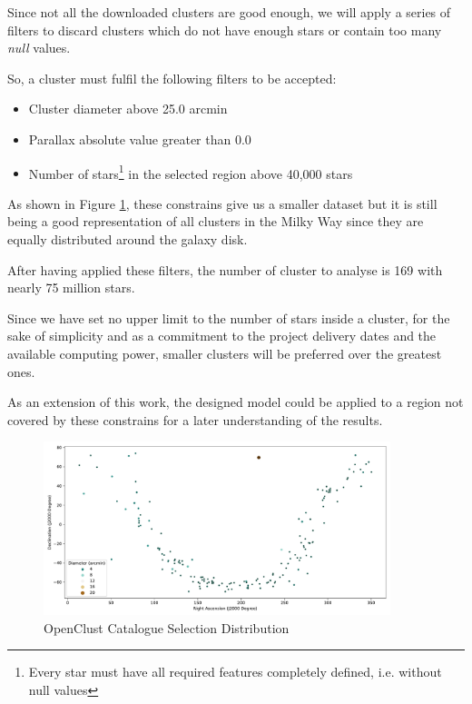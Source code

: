 \documentclass[11pt, a4paper, english]{book}
\begin{document}
Since not all the downloaded clusters are good enough, we will apply a series of filters to discard clusters which do not have enough stars or contain too
many \emph{null} values.

So, a cluster must fulfil the following filters to be accepted:

\begin{itemize}
  \item Cluster diameter above 25.0 arcmin
  \item Parallax absolute value greater than 0.0
  \item Number of stars\footnote{Every star must have all required features completely defined, i.e. without null values} in the selected region above 40,000 stars
\end{itemize}

As shown in Figure \ref{fig:OpenClustSelection}, these constrains give us a smaller dataset but it is still being a good representation of all clusters in the Milky Way
since they are equally distributed around the galaxy disk.

After having applied these filters, the number of cluster to analyse is 169 with nearly 75 million stars.

Since we have set no upper limit to the number of stars inside a cluster, for the sake of simplicity and as a commitment to the project delivery dates
and the available computing power, smaller clusters will be preferred over the greatest ones.

As an extension of this work, the designed model could be applied to a region not covered by these constrains for a later understanding of the results.

\begin{figure}[htbp]
  \centering
  \includegraphics[width=0.9\textwidth]{../figures/cluster_selection_tier1.pdf}
  \caption{OpenClust Catalogue Selection Distribution}
  \label{fig:OpenClustSelection}
\end{figure}
\end{document}
